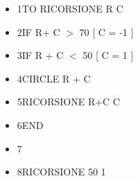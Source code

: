 \begin{table}[H]
\begin{minipage}{1.0\textwidth}
\begin{itemize}[itemsep=-3pt,parsep=2pt]
\item[] \hspace{0.5cm}  1\hspace{8pt}TO RICORSIONE R C
\item[] \hspace{0.5cm}  2\hspace{8pt}\hspace{8pt}IF R+ C $>$ 70 [ C = -1 ]
\item[] \hspace{0.5cm}  3\hspace{8pt}\hspace{8pt}IF R + C $<$ 50 [ C = 1 ]
\item[] \hspace{0.5cm}	4\hspace{8pt}\hspace{8pt}CIRCLE R + C
\item[] \hspace{0.5cm}  5\hspace{8pt}\hspace{8pt}RICORSIONE R+C C
\item[] \hspace{0.5cm}  6\hspace{8pt}END
\item[] \hspace{0.5cm}  7\hspace{8pt} 
\item[] \hspace{0.5cm}  8\hspace{8pt}RICORSIONE 50 1             
\end{itemize}          	          
\end{minipage}           
\end{table}
                
\vskip 1cm

